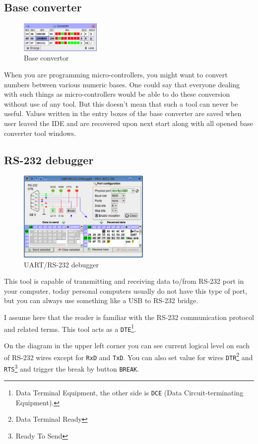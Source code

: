 \documentclass[a4paper,twoside,12pt]{book}
\begin{document}
		\subsection{Base converter}
			\begin{figure}
				\centering{}
				\includegraphics[width=110pt]{img/021.png}
				\caption{Base convertor}
			\end{figure}
			When you are programming micro-controllers, you might want to convert numbers between various numeric bases. One could say that everyone dealing with such things as micro-controllers would be able to do these conversion without use of any tool. But this doesn't mean that such a tool can never be useful. Values written in the entry boxes of the base converter are saved when user leaved the IDE and are recovered upon next start along with all opened base converter tool windows.

		\subsection{RS-232 debugger}
			\begin{figure}
				\centering{}
				\includegraphics[width=180pt]{img/035.png}
				\caption{UART/RS-232 debugger}
			\end{figure}
			This tool is capable of transmitting and receiving data to/from RS-232 port in your computer, today personal computers usually do not have this type of port, but you can always use something like a USB to RS-232 bridge.

			I assume here that the reader is familiar with the RS-232 communication protocol and related terms. This tool acts as a \texttt{DTE}\footnote{Data Terminal Equipment, the other side is \texttt{DCE} (Data Circuit-terminating Equipment).}.

			On the diagram in the upper left corner you can see current logical level on each of RS-232 wires except for \texttt{RxD} and \texttt{TxD}. You can also set value for wires \texttt{DTR}\footnote{Data Terminal Ready} and \texttt{RTS}\footnote{Ready To Send} and trigger the break by button \texttt{BREAK}.
\end{document}
